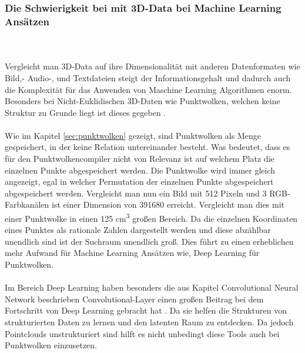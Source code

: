 \documentclass{llncs}
\begin{document}
\subsubsection{Die Schwierigkeit bei mit 3D-Data bei Machine Learning Ansätzen}\label{sec:3dprobleme}
~\\\\
Vergleicht man 3D-Data auf ihre Dimensionalität mit anderen Datenformaten wie Bild,- Audio-, und Textdateien steigt der Informationsgehalt und dadurch auch die Komplexität für das Anwenden von Maschine Learning Algorithmen enorm. Besonders bei Nicht-Euklidischen 3D-Daten wie Punktwolken, welchen keine Struktur zu Grunde liegt ist dieses gegeben \cite{3dprob}.
\\\\
Wie im Kapitel \ref{sec:punktwolken} gezeigt, sind Punktwolken als Menge gespeichert, in der keine Relation untereinander besteht. Was bedeutet, dass es für den Punktwolkencompiler nicht von Relevanz ist auf welchem Platz die einzelnen Punkte abgespeichert werden. Die Punktwolke wird immer gleich angezeigt, egal in welcher Permutation der einzelnen Punkte abgespeichert abgespeichert werden. Vergleicht man nun ein Bild mit 512 Pixeln und 3 RGB-Farbkanälen ist einer Dimension von 391680 erreicht. Vergleicht man dies mit einer Punktwolke in einen 125 cm\textsuperscript{3} großen Bereich. Da die einzelnen Koordinaten eines Punktes als rationale Zahlen dargestellt werden und diese abzählbar unendlich sind ist der Suchraum unendlich groß. Dies führt zu einen erheblichen mehr Aufwand für Machine Learning Ansätzen wie, Deep Learning für Punktwolken.
\\\\
Im Bereich Deep Learning haben besonders die aus Kapitel Convolutional Neural Network beschrieben Convolutional-Layer einen großen Beitrag bei dem Fortschritt von Deep Learning gebracht hat \cite{conv_adv}. Da sie helfen die Strukturen von strukturierten Daten zu lernen und den latenten Raum zu entdecken. Da jedoch Pointclouds unstrukturiert sind hilft es nicht unbedingt diese Tools auch bei Punktwolken einzusetzen.
\newpage
\end{document}
